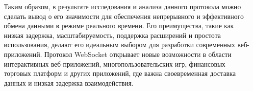 Таким образом, в результате исследования и анализа данного протокола можно сделать вывод о его значимости для обеспечения непрерывного и эффективного обмена данными в режиме реального времени. Его преимущества, такие как низкая задержка, масштабируемость, поддержка расширений и простота использования, делают его идеальным выбором для разработки современных веб-приложений. Протокол WebSocket открывает новые возможности в области интерактивных веб-приложений, многопользовательских игр, финансовых торговых платформ и других приложений, где важна своевременная доставка данных и низкая задержка взаимодействия.